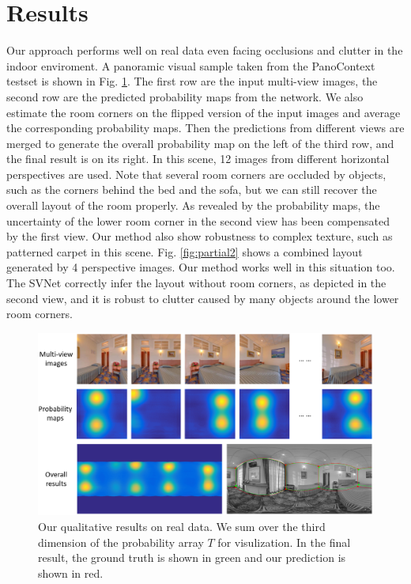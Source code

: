 

\section{Results}
Our approach performs well on real data even facing occlusions and clutter in the indoor enviroment. A panoramic visual sample taken from the PanoContext testset is shown in Fig. \ref{fig:results2}.
%
The first row are the input multi-view images, the second row are the predicted probability maps from the network. We also estimate the room corners on the flipped version of the input images and average the corresponding probability maps. Then the predictions from different views are merged to generate the overall probability map on the left of the third row, and the final result is on its right. 
%
In this scene, 12 images from different horizontal perspectives are used. Note that several room corners are occluded by objects, such as the corners behind the bed and the sofa, but we can still recover the overall layout of the room properly. As revealed by the probability maps, the uncertainty of the lower room corner in the second view has been compensated by the first view. Our method also show robustness to complex texture, such as patterned carpet in this scene. 
%
Fig. \ref{fig:partial2} shows a combined layout generated by 4 perspective images. Our method works well in this situation too. The SVNet correctly infer the layout without room corners, as depicted in the second view, and it is robust to clutter caused by many objects around the lower room corners.


\begin{figure}[ht]
	\centering
	\includegraphics[width=\linewidth]{figs/results2.png}
	\caption{Our qualitative results on real data. We sum over the third dimension of the probability array $T$ for visulization. In the final result, the ground truth is shown in green and our prediction is shown in red. }
	\label{fig:results2}
\end{figure}

